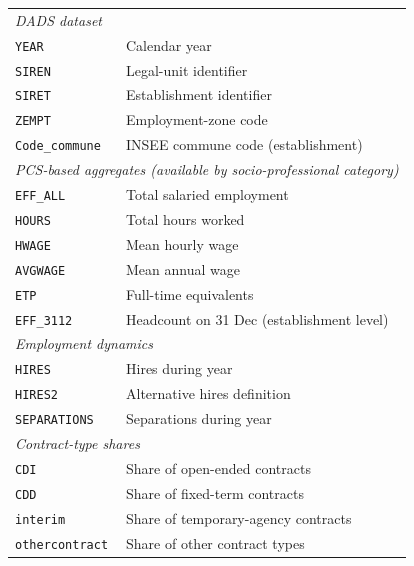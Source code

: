 \begin{landscape}
\begin{ThreePartTable}
\begin{longtable}{@{}p{9cm}p{9cm}@{}}
\multicolumn{2}{l}{\textit{DADS dataset}}\\[0.2em]
\texttt{YEAR}             & Calendar year\\
\texttt{SIREN}            & Legal-unit identifier\\
\texttt{SIRET}            & Establishment identifier\\
\texttt{ZEMPT}            & Employment-zone code\\
\texttt{Code\_commune}    & INSEE commune code (establishment)\\[0.5em]

\multicolumn{2}{l}{\textit{PCS-based aggregates (available by socio-professional category)}}\\[0.2em]
\texttt{EFF\_ALL}         & Total salaried employment\\
\texttt{HOURS}            & Total hours worked\\
\texttt{HWAGE}            & Mean hourly wage\\
\texttt{AVGWAGE}          & Mean annual wage\\
\texttt{ETP}              & Full-time equivalents\\
\texttt{EFF\_3112}        & Headcount on 31 Dec (establishment level)\\ [0.5em]

\multicolumn{2}{l}{\textit{Employment dynamics}}\\[0.2em]
\texttt{HIRES}            & Hires during year\\
\texttt{HIRES2}           & Alternative hires definition\\
\texttt{SEPARATIONS}      & Separations during year\\[0.5em]

\multicolumn{2}{l}{\textit{Contract-type shares}}\\[0.2em]
\texttt{CDI}              & Share of open-ended contracts\\
\texttt{CDD}              & Share of fixed-term contracts\\
\texttt{interim}          & Share of temporary-agency contracts\\
\texttt{othercontract}    & Share of other contract types\\[0.5em]


\end{longtable}
\end{ThreePartTable}
\end{landscape}
